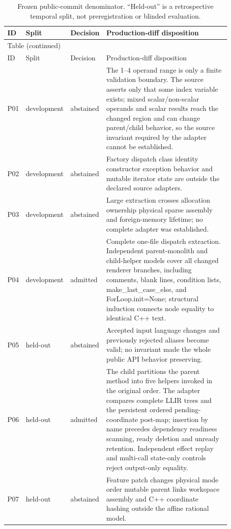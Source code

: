 \begin{longtable}{@{}p{0.055\linewidth}p{0.13\linewidth}p{0.13\linewidth}p{0.585\linewidth}@{}}
\caption{Frozen public-commit denominator. ``Held-out'' is a retrospective temporal split, not preregistration or blinded evaluation.}\label{tab:public-corpus}\\
\toprule ID & Split & Decision & Production-diff disposition\\\midrule\endfirsthead
\multicolumn{4}{l}{Table \thetable{} (continued)}\\
\toprule ID & Split & Decision & Production-diff disposition\\\midrule\endhead
\bottomrule\endfoot
P01 & development & abstained & The 1--4 operand range is only a finite validation boundary. The source asserts only that some index variable exists; mixed scalar/non-scalar operands and scalar results reach the changed region and can change parent/child behavior, so the source invariant required by the adapter cannot be established.\\
P02 & development & abstained & Factory dispatch class identity constructor exception behavior and mutable iterator state are outside the declared source adapters.\\
P03 & development & abstained & Large extraction crosses allocation ownership physical sparse assembly and foreign-memory lifetime; no complete adapter was established.\\
P04 & development & admitted & Complete one-file dispatch extraction. Independent parent-monolith and child-helper models cover all changed renderer branches, including comments, blank lines, condition lists, make\_last\_case\_else, and ForLoop.init=None; structural induction connects node equality to identical C++ text.\\
P05 & held-out & abstained & Accepted input language changes and previously rejected aliases become valid; no invariant made the whole public API behavior preserving.\\
P06 & held-out & admitted & The child partitions the parent method into five helpers invoked in the original order. The adapter compares complete LLIR trees and the persistent ordered pending-coordinate post-map; insertion by name precedes dependency readiness scanning, ready deletion and unready retention. Independent effect replay and multi-call state-only controls reject output-only equality.\\
P07 & held-out & abstained & Feature patch changes physical mode order mutable parent links workspace assembly and C++ coordinate hashing outside the affine rational model.\\

\end{longtable}
